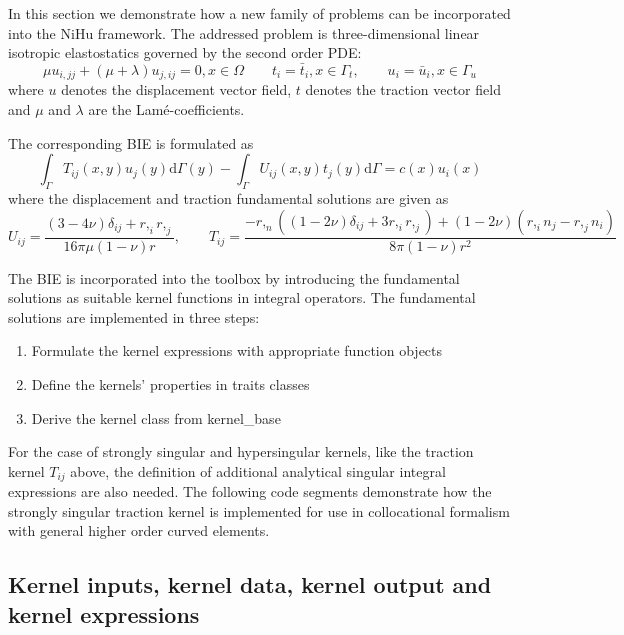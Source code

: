 \documentclass{article}
\newcommand{\td}{\mathrm{d}}
\begin{document}
In this section we demonstrate how a new family of problems can be incorporated into the NiHu framework.
The addressed problem is three-dimensional linear isotropic elastostatics governed by the second order PDE:
%
\begin{equation}
\mu u_{i,jj} + \left(\mu + \lambda\right) u_{j,ij} = 0, x \in \Omega
\qquad t_i = \bar{t}_i, x \in \Gamma_t,
\qquad u_i = \bar{u}_i, x \in \Gamma_u
\end{equation}
%
where $u$ denotes the displacement vector field, $t$ denotes the traction vector field and $\mu$ and $\lambda$ are the Lamé-coefficients.

The corresponding BIE is formulated as
%
\begin{equation}
\int_{\Gamma} T_{ij}(x,y) u_j(y) \td \Gamma(y) - \int_{\Gamma} U_{ij}(x,y) t_{j}(y) \td \Gamma = c(x) u_i(x)
\end{equation}
%
where the displacement and traction fundamental solutions are given as
%
\begin{equation}
U_{ij} = \frac{(3-4\nu) \delta_{ij} + r,_i r,_j}{16 \pi \mu (1-\nu) r}, \qquad
T_{ij} = \frac{-r,_n ((1-2\nu)\delta_{ij} + 3 r,_i r,_j) + (1-2\nu) (r,_i n_j - r,_j n_i)}{8 \pi (1-\nu) r^2}
\end{equation}

The BIE is incorporated into the toolbox by introducing the fundamental solutions as suitable kernel functions in integral operators.
The fundamental solutions are implemented in three steps:
\begin{enumerate}
	\item Formulate the kernel expressions with appropriate function objects
	\item Define the kernels' properties in traits classes
	\item Derive the kernel class from kernel\_base
\end{enumerate}
%
For the case of strongly singular and hypersingular kernels, like the traction kernel $T_{ij}$ above, the definition of additional analytical singular integral expressions are also needed.
The following code segments demonstrate how the strongly singular traction kernel is implemented for use in collocational formalism with general higher order curved elements.

\subsection{Kernel inputs, kernel data, kernel output and kernel expressions}
\end{document}
